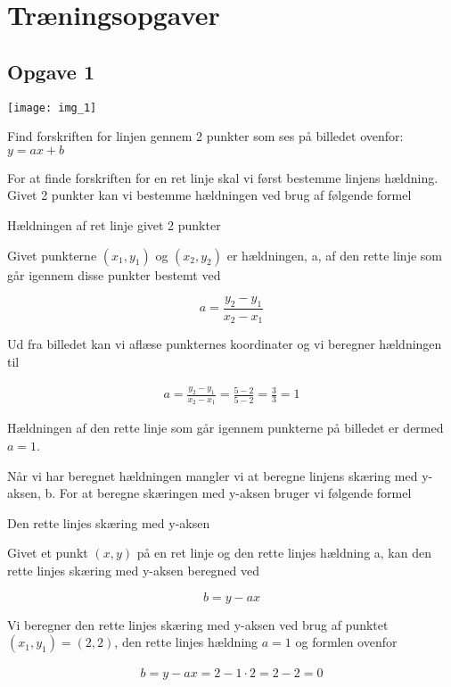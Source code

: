\section{Træningsopgaver}


\subsection{Opgave 1}
\texttt{[image: img\_1]}

Find forskriften for linjen gennem 2 punkter som ses på billedet ovenfor: $y=ax+b$

For at finde forskriften for en ret linje skal vi først bestemme linjens hældning. Givet 2 punkter kan vi bestemme hældningen ved brug af følgende formel

\begin{frm-thm}{Hældningen af ret linje givet 2 punkter}

Givet punkterne $(x_1,y_1)$ og $(x_2,y_2)$ er hældningen, a, af den rette linje som går igennem disse punkter bestemt ved

\[a = \frac{y_2 - y_1}{x_2 - x_1}\]
\end{frm-thm}

Ud fra billedet kan vi aflæse punkternes koordinater og vi beregner hældningen til

\begin{align*}
a = \frac{y_2 - y_1}{x_2 - x_1} = \frac{5-2}{5-2} = \frac{3}{3} = 1
\end{align*}

Hældningen af den rette linje som går igennem punkterne på billedet er dermed $a=1$.

Når vi har beregnet hældningen mangler vi at beregne linjens skæring med y-aksen, b. For at beregne skæringen med y-aksen bruger vi følgende formel

\begin{frm-thm}{Den rette linjes skæring med y-aksen}

Givet et punkt $(x,y)$ på en ret linje og den rette linjes hældning a, kan den rette linjes skæring med y-aksen beregned ved

\[b = y-ax\]

\end{frm-thm}

Vi beregner den rette linjes skæring med y-aksen ved brug af punktet $(x_1,y_1) = (2,2)$, den rette linjes hældning $a = 1$ og formlen ovenfor

\begin{align*}
b=y-ax = 2-1\cdot 2 = 2 - 2 = 0
\end{align*}

